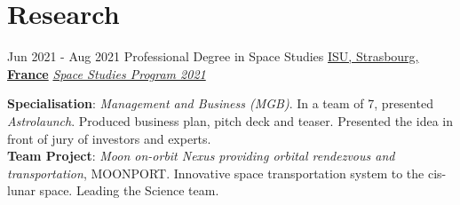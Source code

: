 \documentclass[letterpaper]{twentysecondcv} %
\begin{document}
\section{Research}
\begin{twenty}
	\twentyitem
    	{Jun 2021 -}
		{Aug 2021}
        {Professional Degree in Space Studies}
        {\href{https://www.isunet.edu/}{ISU, Strasbourg, \textbf{France}}}
        {\href{https://www.isunet.edu/ssp/}{\textit{Space Studies Program 2021}}}
        {
            \textbf{Specialisation}: \textit{Management and Business (MGB)}. In a team of 7, presented \textit{Astrolaunch}. Produced business plan, pitch deck and teaser. Presented the idea in front of jury of investors and experts.\\
            \textbf{Team Project}: \textit{Moon on-orbit Nexus providing orbital rendezvous and transportation}, MOONPORT. Innovative space transportation system to the cis-lunar space. Leading the Science team.

}
\end{twenty}
\end{document}
